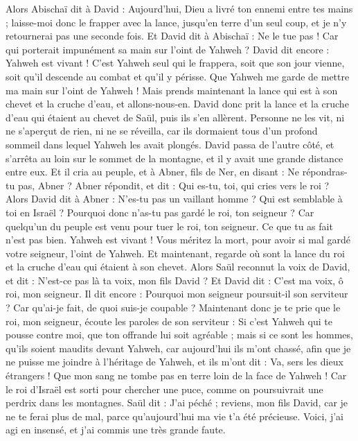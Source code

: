 \begin{multicols}{2}
Alors Abischaï dit à David : Aujourd'hui, Dieu a livré ton ennemi entre tes mains ; laisse-moi donc le frapper avec la lance, jusqu'en terre d'un seul coup, et je n'y retournerai pas une seconde fois.
Et David dit à Abischaï : Ne le tue pas ! Car qui porterait impunément sa main sur l'oint de Yahweh ?
David dit encore : Yahweh est vivant ! C’est Yahweh seul qui le frappera, soit que son jour vienne, soit qu'il descende au combat et qu'il y périsse.
Que Yahweh me garde de mettre ma main sur l'oint de Yahweh ! Mais prends maintenant la lance qui est à son chevet et la cruche d’eau, et allons-nous-en.
David donc prit la lance et la cruche d’eau qui étaient au chevet de Saül, puis ils s'en allèrent. Personne ne les vit, ni ne s’aperçut de rien, ni ne se réveilla, car ils dormaient tous d’un profond sommeil dans lequel Yahweh les avait plongés.
David passa de l'autre côté, et s'arrêta au loin sur le sommet de la montagne, et il y avait une grande distance entre eux.
Et il cria au peuple, et à Abner, fils de Ner, en disant : Ne répondras-tu pas, Abner ? Abner répondit, et dit : Qui es-tu, toi, qui cries vers le roi ?
Alors David dit à Abner : N'es-tu pas un vaillant homme ? Qui est semblable à toi en Israël ? Pourquoi donc n'as-tu pas gardé le roi, ton seigneur ? Car quelqu'un du peuple est venu pour tuer le roi, ton seigneur.
Ce que tu as fait n’est pas bien. Yahweh est vivant ! Vous méritez la mort, pour avoir si mal gardé votre seigneur, l'oint de Yahweh. Et maintenant, regarde où sont la lance du roi et la cruche d’eau qui étaient à son chevet.
Alors Saül reconnut la voix de David, et dit : N'est-ce pas là ta voix, mon fils David ? Et David dit : C'est ma voix, ô roi, mon seigneur.
Il dit encore : Pourquoi mon seigneur poursuit-il son serviteur ? Car qu'ai-je fait, de quoi suis-je coupable ?
Maintenant donc je te prie que le roi, mon seigneur, écoute les paroles de son serviteur : Si c'est Yahweh qui te pousse contre moi, que ton offrande lui soit agréable ; mais si ce sont les hommes, qu’ils soient maudits devant Yahweh, car aujourd'hui ils m'ont chassé, afin que je ne puisse me joindre à l'héritage de Yahweh, et ils m'ont dit : Va, sers les dieux étrangers !
Que mon sang ne tombe pas en terre loin de la face de Yahweh ! Car le roi d’Israël est sorti pour chercher une puce, comme on poursuivrait une perdrix dans les montagnes.
Saül dit : J'ai péché ; reviens, mon fils David, car je ne te ferai plus de mal, parce qu'aujourd'hui ma vie t'a été précieuse. Voici, j'ai agi en insensé, et j'ai commis une très grande faute.

\end{multicols}
